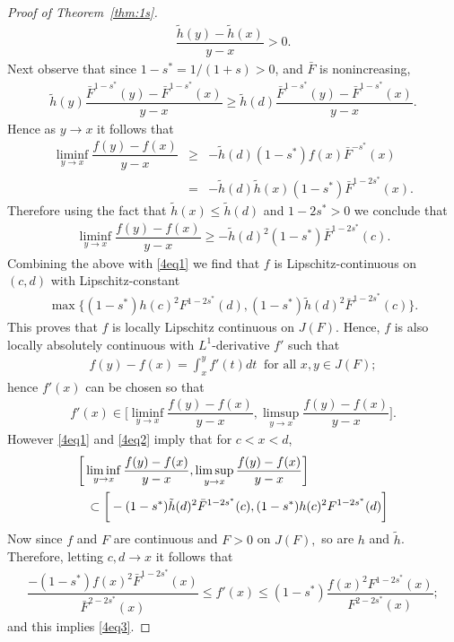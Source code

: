 \documentclass[11pt]{amsart}
\numberwithin{equation}{section}
\theoremstyle{definition}\newtheorem{definition}{Definition}
\theoremstyle{remark}\newtheorem{assumption}{Assumption}
\theoremstyle{remark}\newtheorem{remark}{Remark}
\theoremstyle{definition}\newtheorem{example}{Example}
\theoremstyle{plain}\newtheorem{question}{Question}
\theoremstyle{plain}\newtheorem{theorem}{Theorem}
\theoremstyle{plain}\newtheorem{lemma}{Lemma}
\theoremstyle{plain}\newtheorem{proposition}{Proposition}
\theoremstyle{plain}\newtheorem{corollary}{Corollary}
\theoremstyle{plain}\newtheorem{conjecture}{Conjecture}
\begin{document}
\begin{proof}[Proof of Theorem~\ref{thm:1s}]
\begin{eqnarray*}
\dfrac{\tilde{h}(y)-\tilde{h}(x)}{y-x}>0.
\end{eqnarray*} 
Next observe that since $1-s^*=1/(1+s)>0$, and $\bar{F}$ is nonincreasing, 
\begin{eqnarray*}
\tilde{h}(y)\dfrac{\bar{F}^{1-s^*}(y)-\bar{F}^{1-s^*}(x)}{y-x}\geq \tilde{h}(d)\dfrac{\bar{F}^{1-s^*}(y)-\bar{F}^{1-s^*}(x)}{y-x}.
\end{eqnarray*}
Hence as $y\to x$ it follows that   
\begin{eqnarray*}
\liminf_{y\to x}\dfrac{f(y)-f(x)}{y-x}
& \geq &-\tilde{h}(d)(1-s^*)f(x)\bar{F}^{-s^*}(x)\\
& = & -\tilde{h}(d)\tilde{h}(x)(1-s^*)\bar{F}^{1-2s^*}(x).
\end{eqnarray*}
Therefore using the fact that $\tilde{h}(x)\leq \tilde{h}(d)$ and $1-2s^*>0$ we conclude that 
\begin{eqnarray*}
\liminf_{y\to x}\dfrac{f(y)-f(x)}{y-x}\geq -\tilde{h}(d)^2(1-s^*)\bar{F}^{1-2s^*}(c).
\label{4eq2}
\end{eqnarray*}
Combining the above with \eqref{4eq1} we find that $f$ is Lipschitz-continuous on $(c,d)$ with Lipschitz-constant 
\begin{eqnarray*}
\max\{(1-s^*)h(c)^2F^{1-2s^*}(d),(1-s^*)\tilde{h}(d)^2\bar{F}^{1-2s^*}(c)\}.
\end{eqnarray*} 
This proves that $f$ is locally Lipschitz continuous on $J(F)$. 
Hence, $f$ is also locally absolutely continuous with $L^1$-derivative $f'$ such that
\begin{eqnarray*}
f(y)-f(x)=\int_{x}^{y}f'(t)dt\ \text{  for all }x,y \in J(F);
\end{eqnarray*}
hence $f'(x)$ can be chosen so that
\begin{eqnarray*}
f'(x)\in\bigg[\liminf_{y\to x}\dfrac{f(y)-f(x)}{y-x},\limsup_{y\to x}\dfrac{f(y)-f(x)}{y-x}\bigg].
\end{eqnarray*}
However \eqref{4eq1} and \eqref{4eq2} imply that for $c<x<d$,
\begin{eqnarray*}
\lefteqn{
\bigg[\liminf_{y\to x}\dfrac{f(y)-f(x)}{y-x},\limsup_{y\to x}\dfrac{f(y)-f(x)}{y-x}\bigg]}\\
&& \subset \bigg[-(1-s^*)\tilde{h}(d)^2\bar{F}^{1-2s^*}(c),(1-s^*)h(c)^2F^{1-2s^*}(d)\bigg]
\end{eqnarray*}
Now since $f$ and $F$ are continuous and $F>0$ on $J(F),$ so are $h$ and $\tilde{h}$. 
Therefore,  letting $c,d\to x$ it follows that 
\begin{eqnarray*}
\dfrac{-(1-s^*)f(x)^2\bar{F}^{1-2s^*}(x)}{\bar{F}^{2-2s^*}(x)}\leq f'(x)\leq (1-s^*)\dfrac{f(x)^2F^{1-2s^*}(x)}{F^{2-2s^*}(x)};
\end{eqnarray*}  %
and this implies \eqref{4eq3}.
          

\end{proof}
\end{document}
